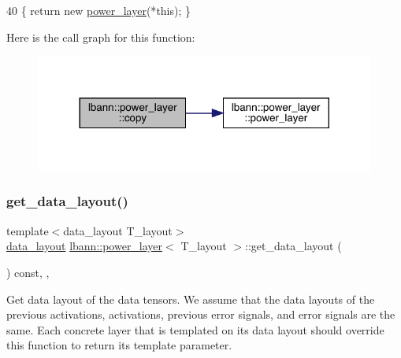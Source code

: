 \begin{DoxyCode}
40 \{ \textcolor{keywordflow}{return} \textcolor{keyword}{new} \hyperlink{classlbann_1_1power__layer_a0429ad3cad14663b8fea013360b60e04}{power\_layer}(*\textcolor{keyword}{this}); \}
\end{DoxyCode}
Here is the call graph for this function\+:\nopagebreak
\begin{figure}[H]
\begin{center}
\leavevmode
\includegraphics[width=317pt]{classlbann_1_1power__layer_adb52a06aad68e2daee5ce2b738954bcb_cgraph}
\end{center}
\end{figure}
\mbox{\label{classlbann_1_1power__layer_aa0b786025082b0d95484ebe58eb0b331}} 
\subsubsection{\texorpdfstring{get\+\_\+data\+\_\+layout()}{get\_data\_layout()}}
{\footnotesize\ttfamily template$<$data\+\_\+layout T\+\_\+layout$>$ \\
\hyperlink{base_8hpp_a786677cbfb3f5677b4d84f3056eb08db}{data\+\_\+layout} \hyperlink{classlbann_1_1power__layer}{lbann\+::power\+\_\+layer}$<$ T\+\_\+layout $>$\+::get\+\_\+data\+\_\+layout (\begin{DoxyParamCaption}{ }\end{DoxyParamCaption}) const\hspace{0.3cm}{\ttfamily [inline]}, {\ttfamily [override]}, {\ttfamily [virtual]}}

Get data layout of the data tensors. We assume that the data layouts of the previous activations, activations, previous error signals, and error signals are the same. Each concrete layer that is templated on its data layout should override this function to return its template parameter. 

